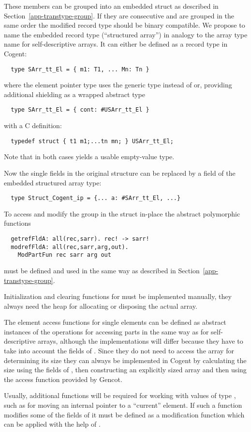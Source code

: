 These members can be grouped into an embedded struct as described in Section~\ref{app-transtype-group}. If they
are consecutive and are grouped in the same order the modified record type should be binary compatible.
We propose to name the embedded record type  (``structured array'') in analogy to the
array type name for self-descriptive arrays. It can either be defined as a record type in Cogent:
\begin{verbatim}
  type SArr_tt_El = { m1: T1, ... Mn: Tn }
\end{verbatim}
where the element pointer type  uses the generic type  instead of 
or, providing additional shielding as a wrapped abstract type 
\begin{verbatim}
  type SArr_tt_El = { cont: #USArr_tt_El }
\end{verbatim}
with a C definition:
\begin{verbatim}
  typedef struct { t1 m1;...tn mn; } USArr_tt_El;
\end{verbatim}
Note that in both cases  yields a usable empty-value type.

Now the single fields in the original structure can be replaced by a field of the embedded structured array type:
\begin{verbatim}
  type Struct_Cogent_ip = {... a: #SArr_tt_El, ...}
\end{verbatim}

To access and modify the group in the struct in-place the abstract polymorphic functions
\begin{verbatim}
  getrefFldA: all(rec,sarr). rec! -> sarr!
  modrefFldA: all(rec,sarr,arg,out). 
    ModPartFun rec sarr arg out 
\end{verbatim}
must be defined and used in the same way as described in Section~\ref{app-transtype-group}.

Initialization and clearing functions for  must be implemented manually, they always need the
heap for allocating or disposing the actual array. 

The element access functions for single elements can be defined as abstract instances of the operations for accessing parts 
in the same way as for self-descriptive arrays, although the implementations will differ because they have to 
take into account the fields of . Since they do not need to access the array for determining its size
they can always be implemented in Cogent by calculating the size using the fields of , then constructing
an explicitly sized array and then using the access function provided by Gencot.

Usually, additional functions will be required for working
with values of type , such as for moving an internal pointer to a ``current'' element.
If such a function modifies some of the fields of  it must be defined as a modification function
which can be applied with the help of .
